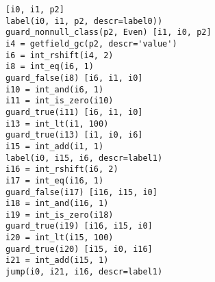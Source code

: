\begin{verbatim}
[i0, i1, p2]
label(i0, i1, p2, descr=label0))
guard_nonnull_class(p2, Even) [i1, i0, p2]
i4 = getfield_gc(p2, descr='value')
i6 = int_rshift(i4, 2)
i8 = int_eq(i6, 1)
guard_false(i8) [i6, i1, i0]
i10 = int_and(i6, 1)
i11 = int_is_zero(i10)
guard_true(i11) [i6, i1, i0]
i13 = int_lt(i1, 100)
guard_true(i13) [i1, i0, i6]
i15 = int_add(i1, 1)
label(i0, i15, i6, descr=label1)
i16 = int_rshift(i6, 2)
i17 = int_eq(i16, 1)
guard_false(i17) [i16, i15, i0]
i18 = int_and(i16, 1)
i19 = int_is_zero(i18)
guard_true(i19) [i16, i15, i0]
i20 = int_lt(i15, 100)
guard_true(i20) [i15, i0, i16]
i21 = int_add(i15, 1)
jump(i0, i21, i16, descr=label1)
\end{verbatim}
